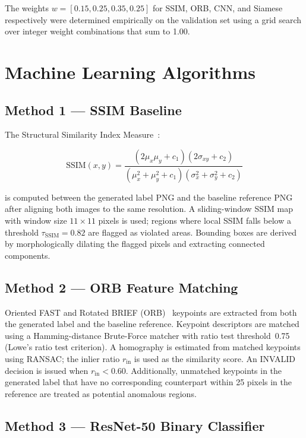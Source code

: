 The weights $w = [0.15, 0.25, 0.35, 0.25]$ for SSIM, ORB, CNN, and Siamese
respectively were determined empirically on the validation set using a grid search over
integer weight combinations that sum to 1.00.

\section{Machine Learning Algorithms}
\label{sec:ml_algorithms}

\subsection{Method 1 — SSIM Baseline}

The Structural Similarity Index Measure~\cite{wang2004ssim}:

\begin{equation}
\text{SSIM}(x, y) = \frac{(2\mu_x\mu_y + c_1)(2\sigma_{xy} + c_2)}
                         {(\mu_x^2 + \mu_y^2 + c_1)(\sigma_x^2 + \sigma_y^2 + c_2)}
\label{eq:ssim}
\end{equation}

is computed between the generated label PNG and the baseline reference PNG after
aligning both images to the same resolution. A sliding-window SSIM map with window
size $11 \times 11$ pixels is used; regions where local SSIM falls below a threshold
$\tau_\text{SSIM} = 0.82$ are flagged as violated areas. Bounding boxes are derived by
morphologically dilating the flagged pixels and extracting connected components.

\subsection{Method 2 — ORB Feature Matching}

Oriented FAST and Rotated BRIEF (ORB)~\cite{rublee2011orb} keypoints are extracted
from both the generated label and the baseline reference. Keypoint descriptors are
matched using a Hamming-distance Brute-Force matcher with ratio test threshold~0.75
(Lowe's ratio test criterion). A homography is estimated from matched keypoints using
RANSAC; the inlier ratio $r_\text{in}$ is used as the similarity score. An INVALID
decision is issued when $r_\text{in} < 0.60$. Additionally, unmatched keypoints in the
generated label that have no corresponding counterpart within 25 pixels in the reference
are treated as potential anomalous regions.

\subsection{Method 3 — ResNet-50 Binary Classifier}
\label{ssec:resnet}

